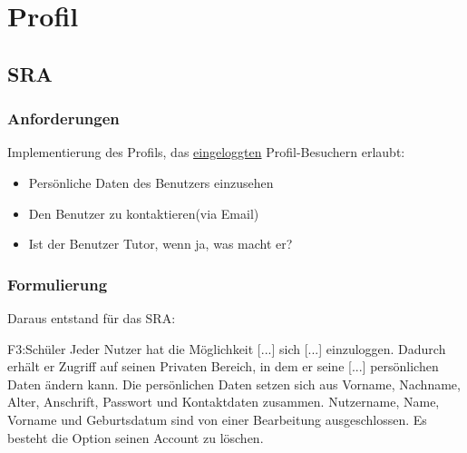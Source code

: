 \section{Profil}
\subsection{SRA}
\begin{frame}
  \frametitle{Anforderungen}
 Implementierung des Profils, das \underline{eingeloggten} Profil-Besuchern erlaubt:
 \bigskip
 \begin{itemize}
  \item Persönliche Daten des Benutzers einzusehen
  \item Den Benutzer zu kontaktieren(via Email)
  \item Ist der Benutzer Tutor, wenn ja, was macht er?
 \end{itemize}
 
\end{frame}
\begin{frame}
\frametitle{Formulierung}
 Daraus entstand für das SRA:
 \bigskip
  \begin{block}{F3:Schüler}
  Jeder Nutzer hat die Möglichkeit [...] sich [...] einzuloggen.
  Dadurch erhält er Zugriff auf seinen Privaten Bereich, in dem er seine [...] persönlichen Daten ändern kann.
  Die persönlichen Daten setzen sich aus Vorname, Nachname, Alter, Anschrift, Passwort und Kontaktdaten zusammen.
  Nutzername, Name, Vorname und Geburtsdatum sind von einer Bearbeitung ausgeschlossen.
  Es besteht die Option seinen Account zu löschen.
 \end{block}
\end{frame}

